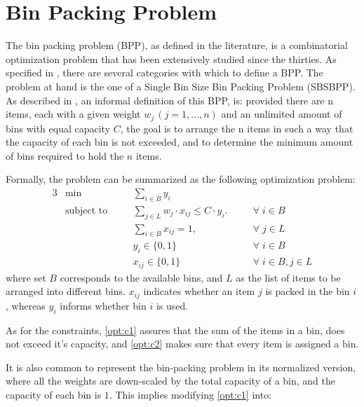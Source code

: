 \chapter{Bin Packing Problem} \label{chap:literature review}

The bin packing problem (BPP), as defined in the literature, is a combinatorial
optimization problem that has been extensively studied since the thirties. As
specified in \cite{wascher2007improved}, there are several categories with which
to define a BPP. The problem at hand is the one of a Single Bin Size Bin Packing
Problem (SBSBPP). As described in \cite{delorme2016bin}, an informal definition
of this BPP, is: provided there are n items, each with a given weight \( w_j  \,
(j = 1, ..., n) \) and an unlimited amount of bins with equal capacity \( C \),
the goal is to arrange the n items in such a way that the capacity of each bin
is not exceeded, and to determine the minimum amount of bins required to hold
the $n$ items.

Formally, the problem can be summarized as the following optimization problem:
\begin{alignat}{3}
    &\min       
        &&\sum_{i \in B} y_i 
            && \\
    &\text{subject to} \quad
        && \sum_{j \in L} w_j \cdot x_{ij} \leq C \cdot y_i. \quad      
            && \forall \; i \in B \label{opt:c1} \\
    &   && \sum_{i \in B} x_{ij} = 1, \quad                 
            && \forall \; j \in L \label{opt:c2} \\
    &   && y_i \in \{0, 1\}                                 
            && \forall \; i \in B \\
    &   && x_{ij} \in \{0,1\}                               
            && \forall \; i \in B, j \in L
\end{alignat}
where set $B$ corresponds to the available bins, and $L$ as the list of items to
be arranged into different bins. $x_{ij}$ indicates whether an item $j$ is
packed in the bin $i$, whereas $y_i$ informs whether bin $i$ is used. 

As for the constraints, \ref{opt:c1} assures that the sum of the items in a bin,
does not exceed it's capacity, and \ref{opt:c2} makes sure that every item is
assigned a bin. 

It is also common to represent the bin-packing problem in its normalized
version, where all the weights are down-scaled by the total capacity of a bin,
and the capacity of each bin is $1$. This implies modifying \ref{opt:c1} into:

